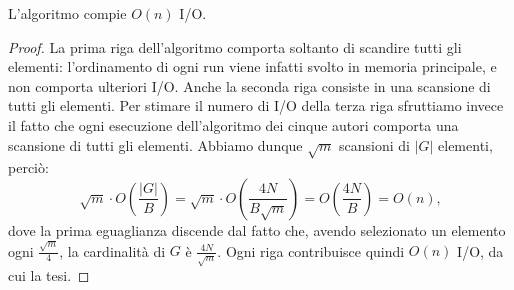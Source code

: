 \begin{lemma}[Costo]
    L'algoritmo compie \(O(n)\) I/O.
\end{lemma}
\begin{proof}
    La prima riga dell'algoritmo comporta soltanto di scandire tutti gli
    elementi: l'ordinamento di ogni run viene infatti svolto in memoria
    principale, e non comporta ulteriori I/O. Anche la seconda riga
    consiste in una scansione di tutti gli elementi. Per stimare il numero
    di I/O della terza riga sfruttiamo invece il fatto che ogni esecuzione
    dell'algoritmo dei cinque autori comporta una scansione di tutti gli
    elementi. Abbiamo dunque \(\sqrt{m}\) scansioni di \(|G|\) elementi,
    perci\`o:
    \[
        \sqrt{m}\cdot O\left(\frac{|G|}{B}\right) = \sqrt{m}\cdot O\left(\frac{4N}{B\sqrt{m}}\right) = O\left(\frac{4N}{B}\right) = O(n)\mbox{,}
    \]
    dove la prima eguaglianza discende dal fatto che, avendo selezionato
    un elemento ogni \(\frac{\sqrt{m}}{4}\), la cardinalit\`a di \(G\) \`e
    \(\frac{4N}{\sqrt{m}}\). Ogni riga contribuisce quindi \(O(n)\) I/O, da cui la tesi.
\end{proof}

